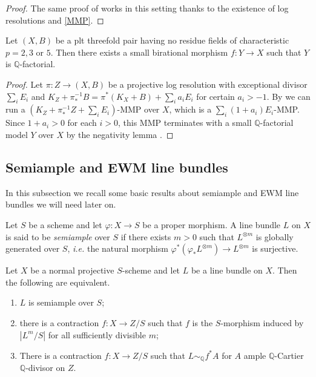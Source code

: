 	\begin{proof}
		The same proof of \cite[Corollary 1.39]{kk-singbook} works in this setting thanks to the existence of log resolutions and \autoref{MMP}.
	\end{proof}
	
	\begin{lemma}\label{Q-factorial}
		Let $(X,B)$ be a plt threefold pair having no residue fields of characteristic $p=2,3$ or $5$. 
		Then there exists a small birational morphism $f \colon Y \to X$ such that $Y$ is $\mathbb{Q}$-factorial.
	\end{lemma}
	\begin{proof}
		Let $\pi \colon Z \to (X,B)$ be a projective log resolution with exceptional divisor $\sum_i E_i$ and $K_Z+\pi_*^{-1}B=\pi^*(K_X+B)+\sum_i a_iE_i$ for certain $a_i >-1$. By \cite[Proposition 9.18]{bhatt2020} we can run a $(K_Z+\pi^{-1}_*Z+\sum_i E_i)$-MMP over $X$, which is a $\sum_i (1+a_i)E_i$-MMP. Since $1+a_i>0$ for each $i>0$, this MMP terminates with a small $\mathbb{Q}$-factorial model $Y$ over $X$ by the negativity lemma \cite[Lemma 2.14]{bhatt2020}.
	\end{proof}
	
	\subsection{Semiample and EWM line bundles}
	
	In this subsection we recall some basic results about semiample and EWM line bundles we will need later on. 
	
	\begin{definition}
		Let $S$ be a scheme and let $\varphi \colon X \to S$ be a proper morphism. A line bundle $L$ on $X$ is said to be \textit{semiample} over $S$ if there exists $m>0$ such that $L^{\otimes m}$ is globally generated over $S$, \emph{i.e.} the natural morphism $\varphi^*(\varphi_*L^{\otimes m}) \to L^{\otimes m}$ is surjective.
	\end{definition} 
	
	\begin{theorem}\label{t-semiamplefibration}
		Let $X$ be a normal projective $S$-scheme and let $L$ be a line bundle on $X$. Then the following are equivalent.
		\begin{enumerate}
			\item $L$ is semiample over $S$;
			\item there is a contraction 
			$f\colon X\to Z/S$
			such that $f$ is the $S$-morphism induced by $|L^m/S|$ for all sufficiently divisible $m$;
			\item There is a contraction 
			$f\colon X\to Z/S$
			such that $L\sim_{\mathbb{Q}} f^{*}A$ for $A$ ample $\mathbb{Q}$-Cartier $\mathbb{Q}$-divisor on $Z$.
		\end{enumerate}
	\end{theorem}
	

